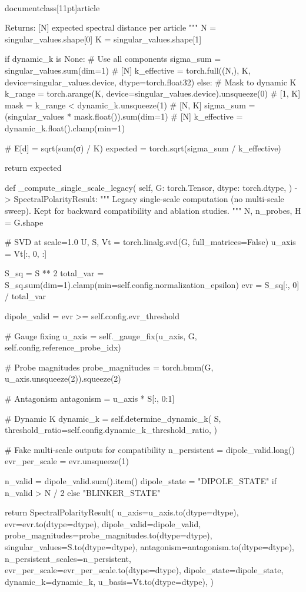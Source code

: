 \\documentclass[11pt]{article}
\begin{document}
\begin{CodeBlock}
        Returns:
            [N] expected spectral distance per article
        """
        N = singular_values.shape[0]
        K = singular_values.shape[1]

        if dynamic_k is None:
            # Use all components
            sigma_sum = singular_values.sum(dim=1)  # [N]
            k_effective = torch.full((N,), K, device=singular_values.device, dtype=torch.float32)
        else:
            # Mask to dynamic K
            k_range = torch.arange(K, device=singular_values.device).unsqueeze(0)  # [1, K]
            mask = k_range < dynamic_k.unsqueeze(1)  # [N, K]
            sigma_sum = (singular_values * mask.float()).sum(dim=1)  # [N]
            k_effective = dynamic_k.float().clamp(min=1)

        # E[d] = sqrt(sum(σ) / K)
        expected = torch.sqrt(sigma_sum / k_effective)

        return expected

    def _compute_single_scale_legacy(
        self,
        G: torch.Tensor,
        dtype: torch.dtype,
    ) -> SpectralPolarityResult:
        """
        Legacy single-scale computation (no multi-scale sweep).
        Kept for backward compatibility and ablation studies.
        """
        N, n_probes, H = G.shape

        # SVD at scale=1.0
        U, S, Vt = torch.linalg.svd(G, full_matrices=False)
        u_axis = Vt[:, 0, :]

        S_sq = S ** 2
        total_var = S_sq.sum(dim=1).clamp(min=self.config.normalization_epsilon)
        evr = S_sq[:, 0] / total_var

        dipole_valid = evr >= self.config.evr_threshold

        # Gauge fixing
        u_axis = self._gauge_fix(u_axis, G, self.config.reference_probe_idx)

        # Probe magnitudes
        probe_magnitudes = torch.bmm(G, u_axis.unsqueeze(2)).squeeze(2)

        # Antagonism
        antagonism = u_axis * S[:, 0:1]

        # Dynamic K
        dynamic_k = self.determine_dynamic_k(
            S,
            threshold_ratio=self.config.dynamic_k_threshold_ratio,
        )

        # Fake multi-scale outputs for compatibility
        n_persistent = dipole_valid.long()
        evr_per_scale = evr.unsqueeze(1)

        n_valid = dipole_valid.sum().item()
        dipole_state = "DIPOLE_STATE" if n_valid > N / 2 else "BLINKER_STATE"

        return SpectralPolarityResult(
            u_axis=u_axis.to(dtype=dtype),
            evr=evr.to(dtype=dtype),
            dipole_valid=dipole_valid,
            probe_magnitudes=probe_magnitudes.to(dtype=dtype),
            singular_values=S.to(dtype=dtype),
            antagonism=antagonism.to(dtype=dtype),
            n_persistent_scales=n_persistent,
            evr_per_scale=evr_per_scale.to(dtype=dtype),
            dipole_state=dipole_state,
            dynamic_k=dynamic_k,
            u_basis=Vt.to(dtype=dtype),
        )

\end{CodeBlock}
\end{document}
